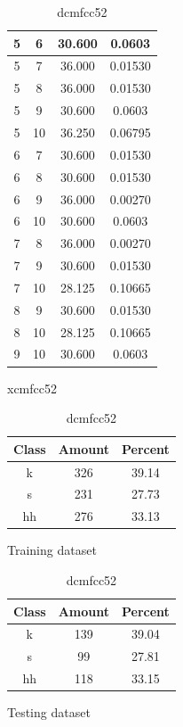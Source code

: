 \begin{table}
\begin{subtable}[tbp]{0.45\textwidth}
{\begin{tabular}{|c|c|c|c|}
 5 & 6 & 30.600 & 0.0603\\ \hline 
 5 & 7 & 36.000 & 0.01530\\ \hline 
 5 & 8 & 36.000 & 0.01530\\ \hline 
 5 & 9 & 30.600 & 0.0603\\ \hline 
 5 & 10 & 36.250 & 0.06795\\ \hline 
 6 & 7 & 30.600 & 0.01530\\ \hline 
 6 & 8 & 30.600 & 0.01530\\ \hline 
 6 & 9 & 36.000 & 0.00270\\ \hline 
 6 & 10 & 30.600 & 0.0603\\ \hline 
 7 & 8 & 36.000 & 0.00270\\ \hline 
 7 & 9 & 30.600 & 0.01530\\ \hline 
 7 & 10 & 28.125 & 0.10665\\ \hline 
 8 & 9 & 30.600 & 0.01530\\ \hline 
 8 & 10 & 28.125 & 0.10665\\ \hline 
 9 & 10 & 30.600 & 0.0603\\ \hline 

\end{tabular}
} \label{xlmfcc52}
\caption{xcmfcc52}
\end{subtable}

\begin{subtable}[tbp]{0.45\textwidth}
\centering
\begin{tabular}{|c|c|c|}
\hline
Class & Amount & Percent\\ \hline
k & 326 & 39.14\\ \hline
s & 231 & 27.73\\ \hline
hh & 276 & 33.13\\ \hline
\end{tabular}
\caption{Training dataset}
\end{subtable}
\hfill
\begin{subtable}[tbp]{0.45\textwidth}
\centering
\begin{tabular}{|c|c|c|}
\hline
Class & Amount & Percent\\ \hline
k & 139 & 39.04\\ \hline
s & 99 & 27.81\\ \hline
hh & 118 & 33.15\\ \hline
\end{tabular}
\caption{Testing dataset}
\end{subtable}
\hfill

\label{dlmfcc52}

\caption{dcmfcc52}

\end{table}\clearpage
